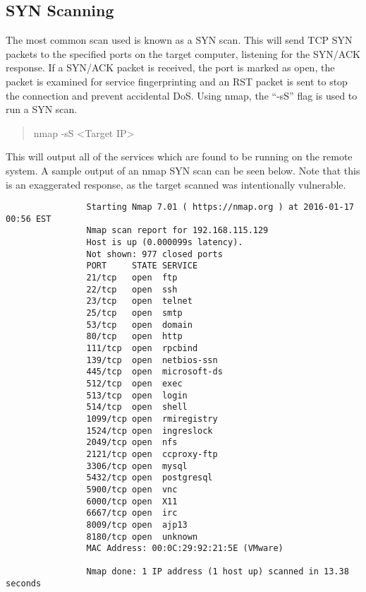 \documentclass[a4paper,11pt]{report}
\begin{document}
		\subsection{SYN Scanning}
			The most common scan used is known as a SYN scan. 
			This will send TCP SYN packets to the specified ports on the target computer, listening for the SYN/ACK response. 
			If a SYN/ACK packet is received, the port is marked as open, the packet is examined for service fingerprinting and an RST packet is sent to stop the connection and prevent accidental DoS. 
			Using nmap, the ``-sS'' flag is used to run a SYN scan. 
			\begin{quote}
				nmap -sS <Target IP>
			\end{quote}
			This will output all of the services which are found to be running on the remote system. 
			A sample output of an nmap SYN scan can be seen below. 
			Note that this is an exaggerated response, as the target scanned was intentionally vulnerable. 
			\begin{verbatim}
				Starting Nmap 7.01 ( https://nmap.org ) at 2016-01-17 00:56 EST
				Nmap scan report for 192.168.115.129
				Host is up (0.000099s latency).
				Not shown: 977 closed ports
				PORT     STATE SERVICE
				21/tcp   open  ftp
				22/tcp   open  ssh
				23/tcp   open  telnet
				25/tcp   open  smtp
				53/tcp   open  domain
				80/tcp   open  http
				111/tcp  open  rpcbind
				139/tcp  open  netbios-ssn
				445/tcp  open  microsoft-ds
				512/tcp  open  exec
				513/tcp  open  login
				514/tcp  open  shell
				1099/tcp open  rmiregistry
				1524/tcp open  ingreslock
				2049/tcp open  nfs
				2121/tcp open  ccproxy-ftp
				3306/tcp open  mysql
				5432/tcp open  postgresql
				5900/tcp open  vnc
				6000/tcp open  X11
				6667/tcp open  irc
				8009/tcp open  ajp13
				8180/tcp open  unknown
				MAC Address: 00:0C:29:92:21:5E (VMware)
	
				Nmap done: 1 IP address (1 host up) scanned in 13.38 seconds
			\end{verbatim}
\end{document}
